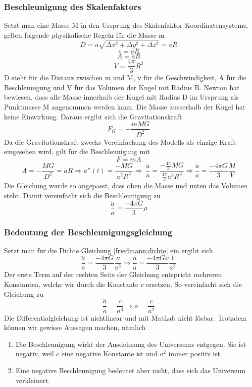 \begin{refsection}
\subsubsection{Beschleunigung des Skalenfaktors}
Setzt man eine Masse M in den Ursprung des Skalenfaktor-Koordinatensystems, gelten folgende physikalische Regeln für die Masse m 
\[D =  a \sqrt{\Delta x^2 + \Delta y^2 + \Delta z^2}  = a R\]
\[v = \dot{a} R\]
\[A = \ddot{a} R\]
\[V = \frac{4 \pi }{3} R^3\]
D steht für die Distanz zwischen m und M, v für die Geschwindigkeit, A für die Beschleunigung und V für das Volumen der Kugel mit Radius R. Newton hat bewiesen, dass alle Masse innerhalb der Kugel mit Radius D im Ursprung als Punktmasse M angenommen werden kann. Die Masse ausserhalb der Kugel hat keine Einwirkung. Daraus ergibt sich die Gravitationskraft
\begin{equation}
F_G = -\frac{m M G}{D^2}
\end{equation}
Da die Gravitationskraft zwecks Vereinfachung des Modells als einzige Kraft eingesehen wird, gilt für die Beschleunigung mit 
\[F = m A\]
\[A = - \frac{M G}{D^2} = \ddot{a} R \Rightarrow a''(t) = \frac{- M G}{a^2 R^3} \Rightarrow\ \frac{\ddot{a}}{a} = \frac{-\frac{4 \pi }{3} M G}{\frac{4 \pi}{3}a^3 R^3} \Rightarrow \frac{\ddot{a}}{a} = \frac{- 4 \pi G}{3} \frac{M}{V}\]
Die Gleichung wurde so angepasst, dass oben die Masse und unten das Volumen steht. Damit vereinfacht sich die Beschleunigung zu
\begin{equation}
\frac{\ddot{a}}{a} = \frac{- 4 \pi G}{3} \rho
\end{equation}
\subsubsection{Bedeutung der Beschleunigungsgleichung}
Setzt man für die Dichte Gleichung \ref{friedmann:dichte} ein ergibt sich
\[\frac{\ddot{a}}{a} = \frac{- 4 \pi G}{3} \frac{\nu}{a^3} \Rightarrow \frac{\ddot{a}}{a} = \frac{- 4 \pi G \nu}{3} \frac{1}{a^3}\]
Der erste Term auf der rechten Seite der Gleichung entspricht mehreren Konstanten, welche wir durch die Konstante $c$ ersetzen. So vereinfacht sich die Gleichung zu
\[\frac{\ddot{a}}{a} = \frac{c}{a^3} \Rightarrow \ddot{a} = \frac{c}{a^2}\]
Die Differentialgleichung ist nichtlinear und mit MatLab nicht lösbar. Trotzdem können wir gewisse Aussagen machen, nämlich
\begin{enumerate}
	\item Die Beschleunigung wirkt der Ausdehnung des Universums entgegen. Sie ist negativ, weil $c$ eine negative Konstante ist  und $a^2$  immer positiv ist. 
	\item Eine negative Beschleunigung bedeutet aber nicht, dass sich das Universum verkleinert.
\end{enumerate}


\end{refsection}
